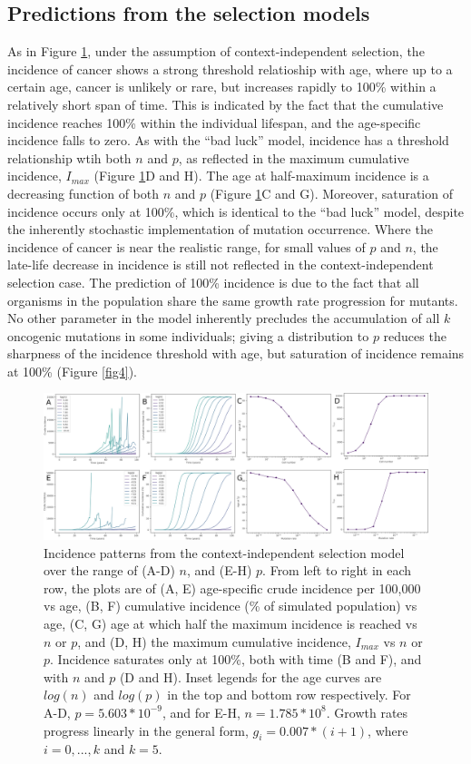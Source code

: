 \documentclass[10pt,twocolumn,twoside]{article}
\begin{document}
\subsection{Predictions from the selection models}
As in Figure \ref{fig3}, under the assumption of context-independent selection, the incidence of cancer shows a strong threshold relatioship with age, where up to a certain age, cancer is unlikely or rare, but increases rapidly to 100\% within a relatively short span of time. This is indicated by the fact that the cumulative incidence reaches 100\% within the individual lifespan, and the age-specific incidence falls to zero. As with the ``bad luck'' model, incidence has a threshold relationship wtih both $n$ and $p$, as reflected in the maximum cumulative incidence, $I_{max}$ (Figure \ref{fig3}D and H). The age at half-maximum incidence is a decreasing function of both $n$ and $p$ (Figure \ref{fig3}C and G). Moreover, saturation of incidence occurs only at 100\%, which is identical to the ``bad luck'' model, despite the inherently stochastic implementation of mutation occurrence. Where the incidence of cancer is near the realistic range, for small values of $p$ and $n$, the late-life decrease in incidence is still not reflected in the context-independent selection case. The prediction of 100\% incidence is due to the fact that all organisms in the population share the same growth rate progression for mutants. No other parameter in the model inherently precludes the accumulation of all $k$ oncogenic mutations in some individuals; giving a distribution to $p$ reduces the sharpness of the incidence threshold with age, but saturation of incidence remains at 100\% (Figure \ref{fig4}). 

\begin{figure}[tbhp]
	\centering
	\includegraphics[width=\linewidth]{fig3.png}
	\caption{Incidence patterns from the context-independent selection model over the range of (A-D) $n$, and (E-H) $p$. From left to right in each row, the plots are of (A, E) age-specific crude incidence per 100,000 vs age, (B, F) cumulative incidence (\% of simulated population) vs age, (C, G) age at which half the maximum incidence is reached vs $n$ or $p$, and (D, H) the maximum cumulative incidence, $I_{max}$ vs $n$ or $p$. Incidence saturates only at 100\%, both with time (B and F), and with $n$ and $p$ (D and H). Inset legends for the age curves are $log(n)$ and $log(p)$ in the top and bottom row respectively. For A-D, $p=5.603*10^{-9}$, and for E-H, $n=1.785*10^{8}$. Growth rates progress linearly in the general form, $g_{i}=0.007*(i+1)$, where $i=0,...,k$ and $k=5$.}
	\label{fig3}
\end{figure}
\end{document}

